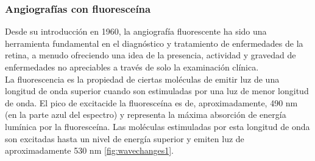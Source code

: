 	\subsubsection{Angiograf\'ias con fluoresce\'ina}

	
Desde su introducci\'on en 1960, la angiograf\'ia fluorescente ha sido una herramienta fundamental en el diagn\'ostico y tratamiento de enfermedades de la retina, a menudo ofreciendo una idea de la presencia, actividad y gravedad de enfermedades no apreciables a trav\'es de solo la examinaci\'on cl\'inica.\cite{patel2014ultra}
\\

La fluorescencia es la propiedad de ciertas mol\'eculas de emitir luz de una longitud de onda superior cuando son
estimuladas por una luz de menor longitud de onda. El pico de excitaci\on de la fluoresce\'ina es de, aproximadamente, 490 nm (en la parte azul del espectro) y representa la m\'axima absorci\'on de energ\'ia lum\'inica por la fluoresce\'ina. Las mol\'eculas estimuladas por esta longitud de onda son excitadas hasta un nivel de energ\'ia superior y emiten luz de aproximadamente 530 nm \ref{fig:wavechanges1}.




